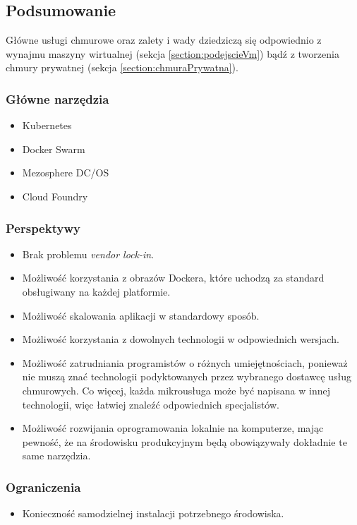 \documentclass[12pt,a4paper,twoside,titlepage,openright]{book}
\begin{document}
\subsection*{Podsumowanie}

Główne usługi chmurowe oraz zalety i wady dziedziczą się odpowiednio z wynajmu maszyny wirtualnej (sekcja \ref{section:podejscieVm}) bądź z tworzenia chmury prywatnej (sekcja \ref{section:chmuraPrywatna}).

\subsubsection{Główne narzędzia}
\begin{itemize}
\item Kubernetes
\item Docker Swarm
\item Mezosphere DC/OS
\item Cloud Foundry
\end{itemize}

\subsubsection{Perspektywy}
\begin{itemize}
\item Brak problemu \textit{vendor lock-in}.
\item Możliwość korzystania z obrazów Dockera, które uchodzą za standard obsługiwany na każdej platformie.
\item Możliwość skalowania aplikacji w standardowy sposób.
\item Możliwość korzystania z dowolnych technologii w odpowiednich wersjach.
\item Możliwość zatrudniania programistów o różnych umiejętnościach, ponieważ nie muszą znać technologii podyktowanych przez wybranego dostawcę usług chmurowych. Co więcej, każda mikrousługa może być napisana w innej technologii, więc łatwiej znaleźć odpowiednich specjalistów.
\item Możliwość rozwijania oprogramowania lokalnie na komputerze, mając pewność, że na środowisku produkcyjnym będą obowiązywały dokładnie te same narzędzia.
\end{itemize}

\subsubsection{Ograniczenia}
\begin{itemize}
\item Konieczność samodzielnej instalacji potrzebnego środowiska.
\end{itemize}
\end{document}
